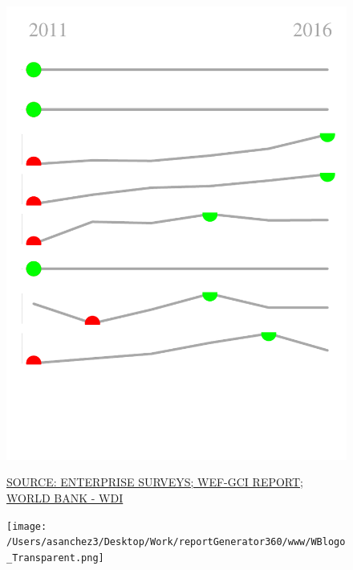 \documentclass{article}\usepackage[]{graphicx}\usepackage[]{color}
\makeatletter
\def\maxwidth{ %
  \ifdim\Gin@nat@width>\linewidth
    \linewidth
  \else
    \Gin@nat@width
  \fi
}
\makeatother
\begin{document}
\begin{figure}
\begin{minipage}[c]{0.95\textwidth}
\begin{minipage}[c]{0.83\textwidth}
{    }
  \end{minipage}
  \begin{minipage}[c]{0.125\textwidth}
    \vspace*{+1cm}


{\centering \includegraphics[width=\maxwidth]{figure/sparklines_Supports-1} 

}



    \vspace*{-0.5cm}
  \end{minipage}
  
  \scriptsize{\href{NA}{\textcolor[HTML]{22A6F5}{SOURCE: ENTERPRISE SURVEYS; WEF-GCI REPORT; WORLD BANK - WDI}}}
\end{minipage}

  \vspace{4ex}
  \begin{minipage}[c]{0.33\textwidth}
    \hspace*{+0.3cm} \texttt{[image: /Users/asanchez3/Desktop/Work/reportGenerator360/www/WBlogo\_Transparent.png]}
  \end{minipage}
  \begin{minipage}[c]{0.65\textwidth}
    \vspace*{-0.1cm}
  \end{minipage}
\end{figure}
\end{document}

